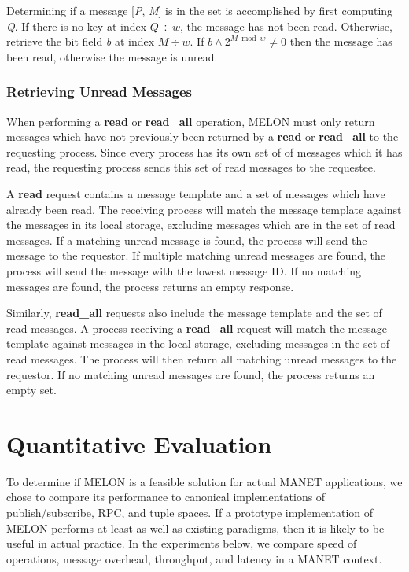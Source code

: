 \documentclass[lnicst]{svmultln}
\begin{document}
Determining if a message [\textit{P}, \textit{M}] is in the set is accomplished by first computing \textit{Q}. If there is no key at index $Q \div w$, the message has not been read. Otherwise, retrieve the bit field \textit{b} at index $M \div w$. If $b \wedge 2^{M \bmod w} \neq 0$ then the message has been read, otherwise the message is unread.
    
\subsubsection{Retrieving Unread Messages}

When performing a \textbf{read} or \textbf{read\_all} operation, MELON must only return messages which have not previously been returned by a \textbf{read} or \textbf{read\_all} to the requesting process. Since every process has its own set of of messages which it has read, the requesting process sends this set of read messages to the requestee.

A \textbf{read} request contains a message template and a set of messages which have already been read. The receiving process will match the message template against the messages in its local storage, excluding messages which are in the set of read messages. If a matching unread message is found, the process will send the message to the requestor. If multiple matching unread messages are found, the process will send the message with the lowest message ID. If no matching messages are found, the process returns an empty response.

Similarly, \textbf{read\_all} requests also include the message template and the set of read messages. A process receiving a \textbf{read\_all} request will match the message template against messages in the local storage, excluding messages in the set of read messages. The process will then return all matching unread messages to the requestor. If no matching unread messages are found, the process returns an empty set.

\section{Quantitative Evaluation}

To determine if MELON is a feasible solution for actual MANET applications, we chose to compare its performance to canonical implementations of publish/subscribe, RPC, and tuple spaces. If a prototype implementation of MELON performs at least as well as existing paradigms, then it is likely to be useful in actual practice. In the experiments below, we compare speed of operations, message overhead, throughput, and latency in a MANET context.
\end{document}
